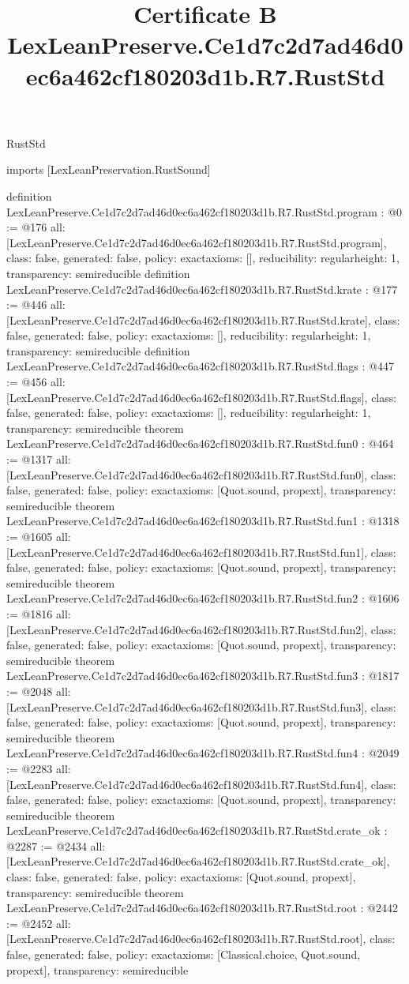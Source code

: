 \begin{lexlean}{RustStd}
\title{Certificate B LexLeanPreserve.Ce1d7c2d7ad46d0ec6a462cf180203d1b.R7.RustStd}
\begin{coremodule}
imports [LexLeanPreservation.RustSound]

definition LexLeanPreserve.Ce1d7c2d7ad46d0ec6a462cf180203d1b.R7.RustStd.program : @0 := @176 {
  all: [LexLeanPreserve.Ce1d7c2d7ad46d0ec6a462cf180203d1b.R7.RustStd.program],
  class: false,
  generated: false,
  policy: exact{axioms: []},
  reducibility: regular{height: 1},
  transparency: semireducible
}
definition LexLeanPreserve.Ce1d7c2d7ad46d0ec6a462cf180203d1b.R7.RustStd.krate : @177 := @446 {
  all: [LexLeanPreserve.Ce1d7c2d7ad46d0ec6a462cf180203d1b.R7.RustStd.krate],
  class: false,
  generated: false,
  policy: exact{axioms: []},
  reducibility: regular{height: 1},
  transparency: semireducible
}
definition LexLeanPreserve.Ce1d7c2d7ad46d0ec6a462cf180203d1b.R7.RustStd.flags : @447 := @456 {
  all: [LexLeanPreserve.Ce1d7c2d7ad46d0ec6a462cf180203d1b.R7.RustStd.flags],
  class: false,
  generated: false,
  policy: exact{axioms: []},
  reducibility: regular{height: 1},
  transparency: semireducible
}
theorem LexLeanPreserve.Ce1d7c2d7ad46d0ec6a462cf180203d1b.R7.RustStd.fun0 : @464 := @1317 {
  all: [LexLeanPreserve.Ce1d7c2d7ad46d0ec6a462cf180203d1b.R7.RustStd.fun0],
  class: false,
  generated: false,
  policy: exact{axioms: [Quot.sound, propext]},
  transparency: semireducible
}
theorem LexLeanPreserve.Ce1d7c2d7ad46d0ec6a462cf180203d1b.R7.RustStd.fun1 : @1318 := @1605 {
  all: [LexLeanPreserve.Ce1d7c2d7ad46d0ec6a462cf180203d1b.R7.RustStd.fun1],
  class: false,
  generated: false,
  policy: exact{axioms: [Quot.sound, propext]},
  transparency: semireducible
}
theorem LexLeanPreserve.Ce1d7c2d7ad46d0ec6a462cf180203d1b.R7.RustStd.fun2 : @1606 := @1816 {
  all: [LexLeanPreserve.Ce1d7c2d7ad46d0ec6a462cf180203d1b.R7.RustStd.fun2],
  class: false,
  generated: false,
  policy: exact{axioms: [Quot.sound, propext]},
  transparency: semireducible
}
theorem LexLeanPreserve.Ce1d7c2d7ad46d0ec6a462cf180203d1b.R7.RustStd.fun3 : @1817 := @2048 {
  all: [LexLeanPreserve.Ce1d7c2d7ad46d0ec6a462cf180203d1b.R7.RustStd.fun3],
  class: false,
  generated: false,
  policy: exact{axioms: [Quot.sound, propext]},
  transparency: semireducible
}
theorem LexLeanPreserve.Ce1d7c2d7ad46d0ec6a462cf180203d1b.R7.RustStd.fun4 : @2049 := @2283 {
  all: [LexLeanPreserve.Ce1d7c2d7ad46d0ec6a462cf180203d1b.R7.RustStd.fun4],
  class: false,
  generated: false,
  policy: exact{axioms: [Quot.sound, propext]},
  transparency: semireducible
}
theorem LexLeanPreserve.Ce1d7c2d7ad46d0ec6a462cf180203d1b.R7.RustStd.crate_ok : @2287 := @2434 {
  all: [LexLeanPreserve.Ce1d7c2d7ad46d0ec6a462cf180203d1b.R7.RustStd.crate_ok],
  class: false,
  generated: false,
  policy: exact{axioms: [Quot.sound, propext]},
  transparency: semireducible
}
theorem LexLeanPreserve.Ce1d7c2d7ad46d0ec6a462cf180203d1b.R7.RustStd.root : @2442 := @2452 {
  all: [LexLeanPreserve.Ce1d7c2d7ad46d0ec6a462cf180203d1b.R7.RustStd.root],
  class: false,
  generated: false,
  policy: exact{axioms: [Classical.choice, Quot.sound, propext]},
  transparency: semireducible
}


\end{coremodule}
\end{lexlean}
